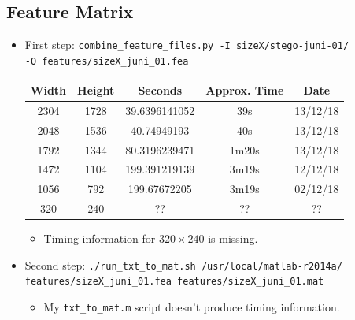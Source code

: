 \documentclass[11pt,a4paper]{report}
\begin{document}
\subsection{Feature Matrix}
\begin{itemize}
\item First step: \texttt{combine\_feature\_files.py -I sizeX/stego-juni-01/} \\
         \texttt{-O features/sizeX\_juni\_01.fea}
  \begin{center}
  \begin{tabular}{ c c | c c c }
  Width & Height & Seconds & Approx. Time & Date \\ \hline
  2304 & 1728 & 39.6396141052 & 39s & 13/12/18 \\
  2048 & 1536 & 40.74949193 & 40s & 13/12/18 \\
  1792 & 1344 & 80.3196239471 & 1m20s & 13/12/18 \\
  1472 & 1104 & 199.391219139 & 3m19s & 12/12/18 \\
  1056 & 792 & 199.67672205 & 3m19s & 02/12/18 \\
  320 & 240 & ?? & ?? & ?? \\
  \end{tabular}
  \end{center}
  \begin{itemize}
  \item Timing information for $320 \times 240$ is missing.
  \end{itemize}

\item Second step: \texttt{./run\_txt\_to\_mat.sh /usr/local/matlab-r2014a/} \\
         \texttt{features/sizeX\_juni\_01.fea features/sizeX\_juni\_01.mat}
  \begin{itemize}
  \item My \texttt{txt\_to\_mat.m} script doesn't produce timing information.
  \end{itemize}
\end{itemize}
\end{document}
